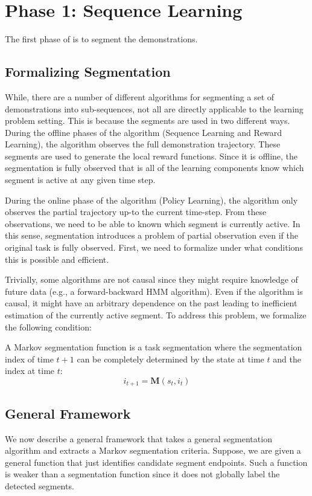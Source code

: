 \section{Phase 1: Sequence Learning}
The first phase of \hirl is to segment the demonstrations.

\subsection{Formalizing Segmentation}
While, there are a number of different algorithms for segmenting a set of demonstrations into sub-sequences, not all are directly applicable to the learning problem setting.
This is because the segments are used in two different ways. During the offline phases of the algorithm (Sequence Learning and Reward Learning), the algorithm observes the full demonstration trajectory.
These segments are used to generate the local reward functions.
Since it is offline, the segmentation is fully observed that is all of the learning components know which segment is active at any given time step.

During the online phase of the algorithm (Policy Learning), the algorithm only observes the partial trajectory up-to the current time-step.
From these observations, we need to be able to known which segment is currently active.
In this sense, segmentation introduces a problem of partial observation even if the original task is fully observed.
First, we need to formalize under what conditions this is possible and efficient.

Trivially, some algorithms are not causal since they might require knowledge of future data (e.g., a forward-backward HMM algorithm).
Even if the algorithm is causal, it might have an arbitrary dependence on the past leading to inefficient estimation of the currently active segment.
To address this problem, we formalize the following condition:

\begin{definition}
A Markov segmentation function is a task segmentation where the segmentation index of time $t+1$ can be completely determined by the state at time $t$ and the index at time $t$:
\[
i_{t+1} = \mathbf{M}(s_t, i_t)  
\]
\end{definition}

\subsection{General Framework}
We now describe a general framework that takes a general segmentation algorithm and extracts a Markov segmentation criteria.
Suppose, we are given a general function that just identifies candidate segment endpoints.
Such a function is weaker than a segmentation function since it does not globally label the detected segments.

